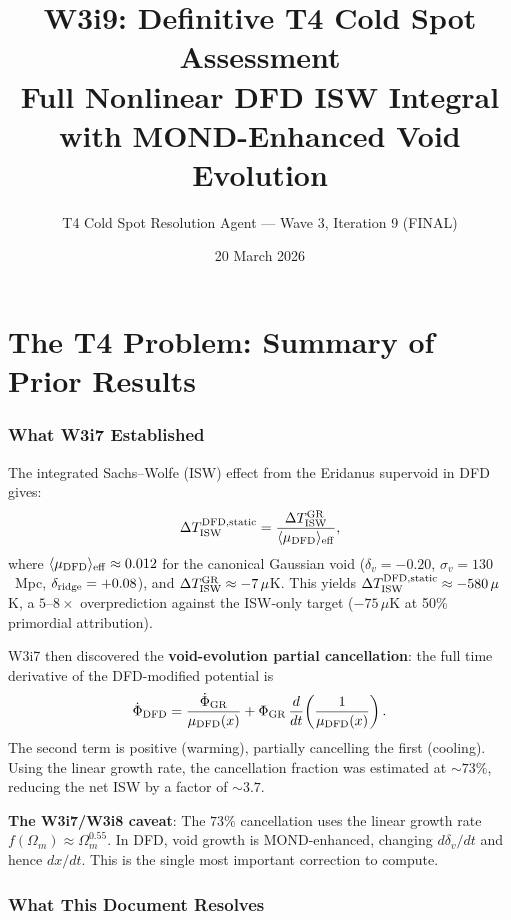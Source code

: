 \documentclass[11pt,a4paper]{article}
\title{\textbf{W3i9: Definitive T4 Cold Spot Assessment}\\[0.5em]
\large Full Nonlinear DFD ISW Integral with MOND-Enhanced Void Evolution}
\author{T4 Cold Spot Resolution Agent --- Wave 3, Iteration 9 (FINAL)}
\date{20 March 2026}
\newcommand{\mufd}{\mu_{\rm DFD}}
\newcommand{\Omm}{\Omega_m}
\begin{document}
\maketitle
\tableofcontents
\newpage

\part{The T4 Problem: Summary of Prior Results}
\label{part:prior}

\section{What W3i7 Established}

The integrated Sachs--Wolfe (ISW) effect from the Eridanus supervoid
in DFD gives:
\begin{equation}
\Delta T_{\rm ISW}^{\rm DFD,static}
= \frac{\Delta T_{\rm ISW}^{\rm GR}}{\langle\mufd\rangle_{\rm eff}},
\label{eq:static-ratio}
\end{equation}
where $\langle\mufd\rangle_{\rm eff} \approx 0.012$ for the canonical
Gaussian void ($\delta_v = -0.20$, $\sigma_v = 130$~Mpc,
$\delta_{\rm ridge} = +0.08$), and $\Delta T_{\rm ISW}^{\rm GR}
\approx -7\,\mu$K. This yields
$\Delta T_{\rm ISW}^{\rm DFD,static} \approx -580\,\mu$K, a
$5$--$8\times$ overprediction against the ISW-only target
($-75\,\mu$K at 50\% primordial attribution).

W3i7 then discovered the \textbf{void-evolution partial cancellation}:
the full time derivative of the DFD-modified potential is
\begin{equation}
\dot{\Phi}_{\rm DFD} = \frac{\dot{\Phi}_{\rm GR}}{\mufd(x)}
+ \Phi_{\rm GR}\,\frac{d}{dt}\!\left(\frac{1}{\mufd(x)}\right).
\label{eq:Phi-dot-full}
\end{equation}
The second term is positive (warming), partially cancelling the first
(cooling). Using the linear growth rate, the cancellation fraction was
estimated at $\sim 73\%$, reducing the net ISW by a factor of
$\sim 3.7$.

\textbf{The W3i7/W3i8 caveat}: The $73\%$ cancellation uses the
linear growth rate $f(\Omm) \approx \Omm^{0.55}$. In DFD, void
growth is MOND-enhanced, changing $d\delta_v/dt$ and hence $dx/dt$.
This is the single most important correction to compute.

\section{What This Document Resolves}
\end{document}
